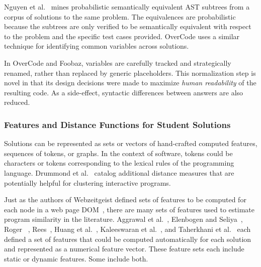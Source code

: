 Nguyen et al.~\cite{codewebs} mines probabilistic semantically equivalent AST subtrees from a corpus of solutions to the same problem. The equivalences are probabilistic because the subtrees are only verified to be semantically equivalent with respect to the problem and the specific test cases provided. OverCode uses a similar technique for identifying common variables across solutions.


In OverCode and Foobaz, variables are carefully tracked and strategically renamed, rather than replaced by generic placeholders. This normalization step is novel in that its design decisions were made to maximize {\it human readability} of the resulting code. As a side-effect, syntactic differences between answers are also reduced.

\subsubsection{Features and Distance Functions for Student Solutions}



Solutions can be represented as sets or vectors of hand-crafted computed features, sequences of tokens, or graphs. In the context of software, tokens could be characters or tokens corresponding to the lexical rules of the programming language. Drummond et al.~\cite{drummond2014learning} catalog additional distance measures that are potentially helpful for clustering interactive programs.


Just as the authors of Webzeitgeist defined sets of features to be computed for each node in a web page DOM~\cite{webzeitgeist}, there are many sets of features used to estimate program similarity in the literature. Aggrawal et al.~\cite{srikant2014system}, Elenbogen and Seliya~\cite{Elenbogen}, Roger ~\cite{ACESthesis}, Rees~\cite{Rees:1982}, Huang et al.~\cite{MOOCshop}, Kaleeswaran et al.~\cite{kaleeswaran2016semi}, and Taherkhani et al.~\cite{taherkhani2010recognizing} each defined a set of features that could be computed automatically for each solution and represented as a numerical feature vector. These feature sets each include static or dynamic features. Some include both.

